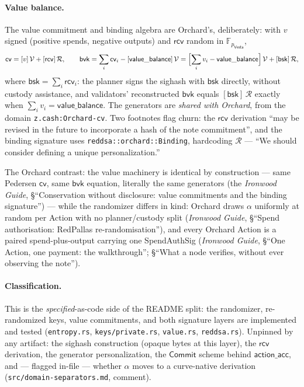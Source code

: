 \documentclass[11pt,a4paper]{article}
\theoremstyle{definition}
\newcommand{\F}{\mathbb{F}}
\newcommand{\Comm}{\mathsf{Commit}}
\newcommand{\cvsym}{\mathsf{cv}}
\newcommand{\Vesta}{\ensuremath{\mathsf{Vesta}}}
\newcommand{\rcv}{\ensuremath{\mathsf{rcv}}}
\begin{document}
\paragraph{Value balance.} The value commitment and binding algebra are
Orchard's, deliberately: with $v$ signed (positive spends, negative
outputs) and $\rcv$ random in $\F_{p_{\Vesta}}$,
\[
\cvsym = [v]\,\mathcal{V} + [\rcv]\,\mathcal{R}, \qquad
\mathsf{bvk} = \sum_i \cvsym_i - [\mathsf{value\_balance}]\,\mathcal{V}
 = \Bigl[\sum_i v_i - \mathsf{value\_balance}\Bigr]\,\mathcal{V}
   + [\mathsf{bsk}]\,\mathcal{R},
\]
where $\mathsf{bsk} = \sum_i \rcv_i$: the planner signs the sighash with
$\mathsf{bsk}$ directly, without custody assistance, and validators'
reconstructed $\mathsf{bvk}$ equals $[\mathsf{bsk}]\,\mathcal{R}$ exactly
when $\sum_i v_i = \mathsf{value\_balance}$. The generators are
\emph{shared with Orchard}, from the domain \texttt{z.cash:Orchard-cv}.
Two footnotes flag churn: the $\rcv$ derivation ``may be revised in the
future to incorporate a hash of the note commitment'', and the binding
signature uses \texttt{reddsa::orchard::Binding}, hardcoding $\mathcal{R}$
--- ``We should consider defining a unique personalization.''

The Orchard contrast: the value machinery is identical by construction ---
same Pedersen $\cvsym$, same $\mathsf{bvk}$ equation, literally the same
generators (the \emph{Ironwood Guide}, \S``Conservation without disclosure:
value commitments and the binding signature'') --- while the randomizer differs
in kind: Orchard draws $\alpha$ uniformly at random per Action with no
planner/custody split (\emph{Ironwood Guide}, \S``Spend authorisation:
RedPallas re-randomisation''), and every Orchard Action is a paired
spend-plus-output carrying one \textsf{SpendAuthSig} (\emph{Ironwood
Guide}, \S``One Action, one payment: the walkthrough''; \S``What a node
verifies, without ever observing the note'').

\paragraph{Classification.} This is the \emph{specified}-as-code side of
the README split: the randomizer, re-randomized keys, value commitments,
and both signature layers are implemented and tested (\texttt{entropy.rs},
\texttt{keys/private.rs}, \texttt{value.rs}, \texttt{reddsa.rs}). Unpinned
by any artifact: the sighash construction (opaque bytes at this layer),
the $\rcv$ derivation, the generator personalization, the $\Comm$ scheme
behind $\mathsf{action\_acc}$, and --- flagged in-file --- whether
$\alpha$ moves to a curve-native derivation
(\texttt{src/domain-separators.md}, comment).
\end{document}

